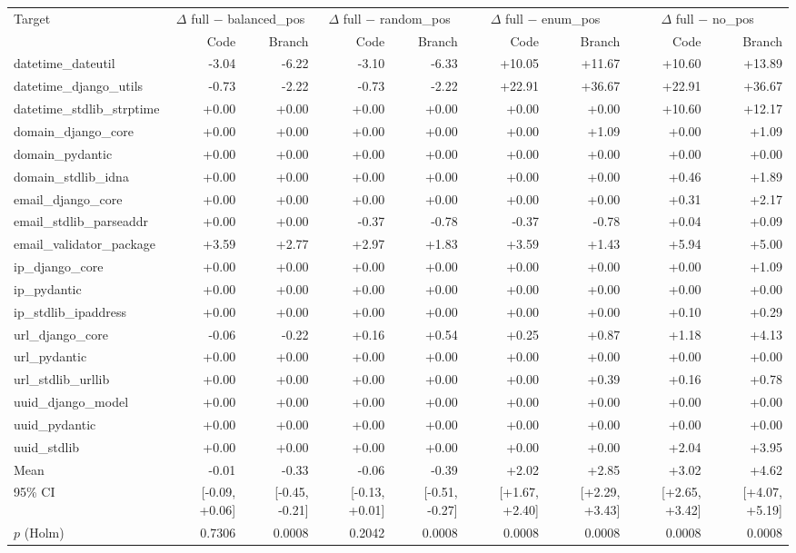 \begin{tabular}{lrrrrrrrr}
\toprule
Target & \multicolumn{2}{c}{$\Delta$ full $-$ balanced\_pos} & \multicolumn{2}{c}{$\Delta$ full $-$ random\_pos} & \multicolumn{2}{c}{$\Delta$ full $-$ enum\_pos} & \multicolumn{2}{c}{$\Delta$ full $-$ no\_pos} \\
 & Code & Branch & Code & Branch & Code & Branch & Code & Branch \\
\midrule
datetime\_dateutil & -3.04 & -6.22 & -3.10 & -6.33 & +10.05 & +11.67 & +10.60 & +13.89 \\
datetime\_django\_utils & -0.73 & -2.22 & -0.73 & -2.22 & +22.91 & +36.67 & +22.91 & +36.67 \\
datetime\_stdlib\_strptime & +0.00 & +0.00 & +0.00 & +0.00 & +0.00 & +0.00 & +10.60 & +12.17 \\
domain\_django\_core & +0.00 & +0.00 & +0.00 & +0.00 & +0.00 & +1.09 & +0.00 & +1.09 \\
domain\_pydantic & +0.00 & +0.00 & +0.00 & +0.00 & +0.00 & +0.00 & +0.00 & +0.00 \\
domain\_stdlib\_idna & +0.00 & +0.00 & +0.00 & +0.00 & +0.00 & +0.00 & +0.46 & +1.89 \\
email\_django\_core & +0.00 & +0.00 & +0.00 & +0.00 & +0.00 & +0.00 & +0.31 & +2.17 \\
email\_stdlib\_parseaddr & +0.00 & +0.00 & -0.37 & -0.78 & -0.37 & -0.78 & +0.04 & +0.09 \\
email\_validator\_package & +3.59 & +2.77 & +2.97 & +1.83 & +3.59 & +1.43 & +5.94 & +5.00 \\
ip\_django\_core & +0.00 & +0.00 & +0.00 & +0.00 & +0.00 & +0.00 & +0.00 & +1.09 \\
ip\_pydantic & +0.00 & +0.00 & +0.00 & +0.00 & +0.00 & +0.00 & +0.00 & +0.00 \\
ip\_stdlib\_ipaddress & +0.00 & +0.00 & +0.00 & +0.00 & +0.00 & +0.00 & +0.10 & +0.29 \\
url\_django\_core & -0.06 & -0.22 & +0.16 & +0.54 & +0.25 & +0.87 & +1.18 & +4.13 \\
url\_pydantic & +0.00 & +0.00 & +0.00 & +0.00 & +0.00 & +0.00 & +0.00 & +0.00 \\
url\_stdlib\_urllib & +0.00 & +0.00 & +0.00 & +0.00 & +0.00 & +0.39 & +0.16 & +0.78 \\
uuid\_django\_model & +0.00 & +0.00 & +0.00 & +0.00 & +0.00 & +0.00 & +0.00 & +0.00 \\
uuid\_pydantic & +0.00 & +0.00 & +0.00 & +0.00 & +0.00 & +0.00 & +0.00 & +0.00 \\
uuid\_stdlib & +0.00 & +0.00 & +0.00 & +0.00 & +0.00 & +0.00 & +2.04 & +3.95 \\
\midrule
Mean & -0.01 & -0.33 & -0.06 & -0.39 & +2.02 & +2.85 & +3.02 & +4.62 \\
95\% CI & [-0.09, +0.06] & [-0.45, -0.21] & [-0.13, +0.01] & [-0.51, -0.27] & [+1.67, +2.40] & [+2.29, +3.43] & [+2.65, +3.42] & [+4.07, +5.19] \\
$p$ (Holm) & 0.7306 & 0.0008 & 0.2042 & 0.0008 & 0.0008 & 0.0008 & 0.0008 & 0.0008 \\
\bottomrule
\end{tabular}

